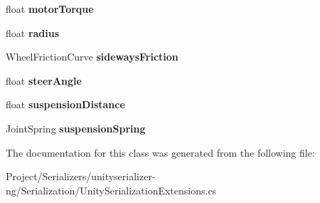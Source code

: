 \begin{DoxyCompactItemize}
float {\bfseries motor\+Torque}
\item 
\mbox{\label{class_serialize_wheel_collider_1_1_stored_information_ad711208a1a46bfcd8c75cc5addf799f4}} 
float {\bfseries radius}
\item 
\mbox{\label{class_serialize_wheel_collider_1_1_stored_information_ab725f43f8c5e1f50539391be1c42477a}} 
Wheel\+Friction\+Curve {\bfseries sideways\+Friction}
\item 
\mbox{\label{class_serialize_wheel_collider_1_1_stored_information_a40eb4138ed9d42574ada5f91fb752e12}} 
float {\bfseries steer\+Angle}
\item 
\mbox{\label{class_serialize_wheel_collider_1_1_stored_information_ac4e026c0f19afa9bd367a5143495ab8f}} 
float {\bfseries suspension\+Distance}
\item 
\mbox{\label{class_serialize_wheel_collider_1_1_stored_information_a54af5bc7641d229df84dd46097804ef2}} 
Joint\+Spring {\bfseries suspension\+Spring}
\end{DoxyCompactItemize}


The documentation for this class was generated from the following file\+:\begin{DoxyCompactItemize}
\item 
Project/\+Serializers/unityserializer-\/ng/\+Serialization/Unity\+Serialization\+Extensions.\+cs\end{DoxyCompactItemize}
